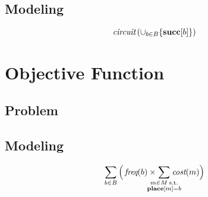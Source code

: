 \subsection{Modeling}

\begin{equation}
  \mCircuit\left(
    \cup_{b \in \mBlockSet} \{\mVar{succ}[b]\}
  \right)
  \labelEquation{block-order}
\end{equation}



\section{Objective Function}
\subsection{Problem}
\subsection{Modeling}

\begin{equation}
  \sum_{b \in \mBlockSet}
  \Big(
    \mFreq(b) \times
    \hspace{-4.5mm}
    \sum_{
      \substack{
        m \in \mMatchSet \:\text{s.t.} \\
        \mVar{place}[m] = b
      }
    }
     \hspace{-4.5mm}
    \mCost(m)
  \Big)
  \labelEquation{naive-objective-function}
\end{equation}
